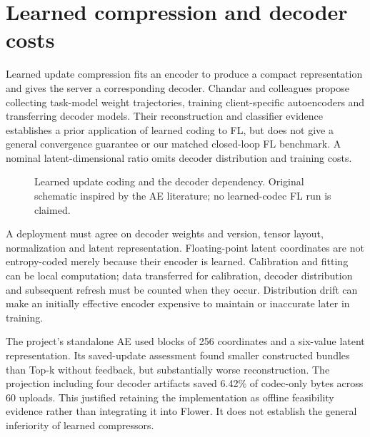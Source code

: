 \documentclass[11pt,a4paper]{article}
\begin{document}
\section{Learned compression and decoder costs}

Learned update compression fits an encoder to produce a compact representation and gives the server a corresponding decoder. Chandar and colleagues propose collecting task-model weight trajectories, training client-specific autoencoders and transferring decoder models. Their reconstruction and classifier evidence establishes a prior application of learned coding to FL, but does not give a general convergence guarantee or our matched closed-loop FL benchmark. A nominal latent-dimensional ratio omits decoder distribution and training costs. \parencite{chandar2021autoencoder}

\begin{figure}[htbp]\centering
{}
\caption{Learned update coding and the decoder dependency. Original schematic inspired by the AE literature; no learned-codec FL run is claimed.}
\label{fig:learned}
\end{figure}

A deployment must agree on decoder weights and version, tensor layout, normalization and latent representation. Floating-point latent coordinates are not entropy-coded merely because their encoder is learned. Calibration and fitting can be local computation; data transferred for calibration, decoder distribution and subsequent refresh must be counted when they occur. Distribution drift can make an initially effective encoder expensive to maintain or inaccurate later in training.

The project's standalone AE used blocks of 256 coordinates and a six-value latent representation. Its saved-update assessment found smaller constructed bundles than Top-k without feedback, but substantially worse reconstruction. The projection including four decoder artifacts saved 6.42\% of codec-only bytes across 60 uploads. This justified retaining the implementation as offline feasibility evidence rather than integrating it into Flower. It does not establish the general inferiority of learned compressors.
\end{document}
